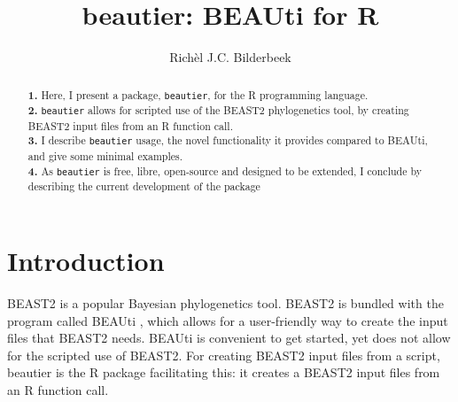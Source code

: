 \documentclass{article}
\title{beautier: BEAUti for R}
\author{Rich\`el J.C. Bilderbeek}
\begin{document}
\maketitle

\begin{abstract}
  \textbf{1. }
  Here, I present a package, \verb;beautier;, for the R programming language. \\
  \textbf{2. }
    \verb;beautier; allows for scripted use of the BEAST2 phylogenetics tool, 
    by creating BEAST2 input files from an R function call. \\
  \textbf{3. }
    I describe \verb;beautier; usage, the novel functionality it provides
    compared to BEAUti, and give some minimal examples. \\
  \textbf{4. }
    As \verb;beautier; is free, libre, open-source and designed to be extended, 
    I conclude by describing the current development of the package \\
\end{abstract}


\section{Introduction}

BEAST2 \cite{bouckaert2014beast} is a popular Bayesian phylogenetics tool.
BEAST2 is bundled with the program called BEAUti \cite{drummond2012bayesian},
which  allows for a user-friendly way to create the
input files that BEAST2 needs. BEAUti is convenient to get started, yet
does not allow for the scripted use of BEAST2. For creating BEAST2 input
files from a script, beautier is the R package facilitating this:
it creates a BEAST2 input files from an R function call.

\end{document}
